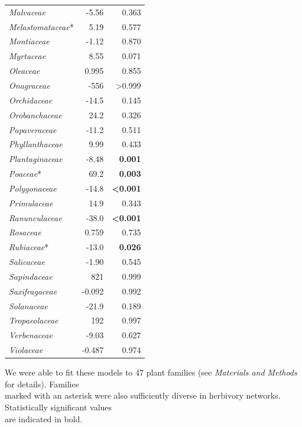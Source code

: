 \documentclass[12pt]{article}
\begin{document}
\begin{table}[!h]
\begin{tabular}{|l  rr|}
    \emph{Malvaceae} &  -5.56  & 0.363 \\
    \emph{Melastomataceae}* &  5.19 & 0.577 \\
    \emph{Montiaceae} &  -1.12  & 0.870 \\
    \emph{Myrtaceae} &  8.55 & 0.071 \\
    \emph{Oleaceae} &  0.995 & 0.855 \\
    \emph{Onagraceae} &  -556  & \textgreater0.999 \\
    \emph{Orchidaceae} &  -14.5 & 0.145 \\
    \emph{Orobanchaceae} &  24.2  & 0.326 \\
    \emph{Papaveraceae} &  -11.2 & 0.511 \\
    \emph{Phyllanthaceae} &  9.99 & 0.433 \\
    \emph{Plantaginaceae} &  -8.48  & \textbf{0.001} \\
    \emph{Poaceae}* &  69.2  & \textbf{0.003} \\
    \emph{Polygonaceae} &  -14.8 & \textbf{\textless0.001} \\
    \emph{Primulaceae} &  14.9  & 0.343 \\
    \emph{Ranunculaceae} &  -38.0 & \textbf{\textless0.001} \\
    \emph{Rosaceae} &  0.759 & 0.735 \\
    \emph{Rubiaceae}* &  -13.0 & \textbf{0.026} \\
    \emph{Salicaceae} &  -1.90  & 0.545 \\
    \emph{Sapindaceae} &  821 & 0.999 \\
    \emph{Saxifragaceae} &  -0.092  & 0.992 \\
    \emph{Solanaceae} &  -21.9 & 0.189 \\
    \emph{Tropaeolaceae} &  192 & 0.997 \\
    \emph{Verbenaceae} &  -9.03  & 0.627 \\
    \emph{Violaceae} &  -0.487  & 0.974 \\
  \hline
  \end{tabular}
  \smallskip
  \footnotesize

    We were able to fit these models to 47 plant families (see \emph{Materials and Methods} for     details). 
    Families \\ marked with an asterisk were also sufficiently diverse in herbivory networks. 
    Statistically significant values \\ are indicated in bold. 

    \end{table}
\end{document}
